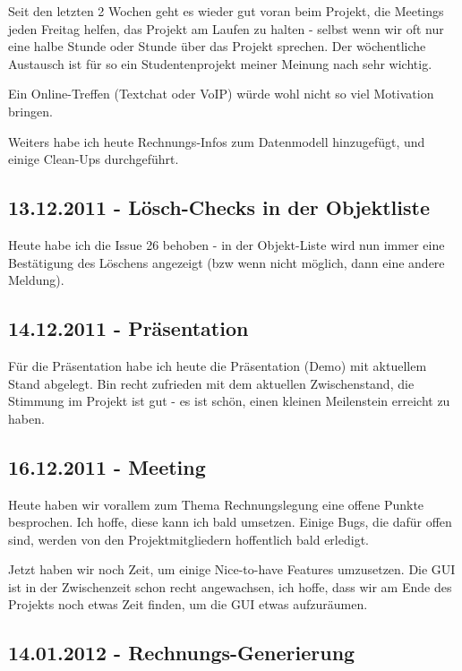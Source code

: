 \documentclass[11pt]{scrartcl}
\begin{document}
Seit den letzten 2 Wochen geht es wieder gut voran beim Projekt, die Meetings
jeden Freitag helfen, das Projekt am Laufen zu halten - selbst wenn wir oft nur
eine halbe Stunde oder Stunde über das Projekt sprechen. Der wöchentliche
Austausch ist für so ein Studentenprojekt meiner Meinung nach sehr wichtig.

Ein Online-Treffen (Textchat oder VoIP) würde wohl nicht so viel Motivation
bringen.

Weiters habe ich heute Rechnungs-Infos zum Datenmodell hinzugefügt, und einige
Clean-Ups durchgeführt.


\subsection{13.12.2011 - Lösch-Checks in der Objektliste}

Heute habe ich die Issue 26 behoben - in der Objekt-Liste wird nun immer eine
Bestätigung des Löschens angezeigt (bzw wenn nicht möglich, dann eine andere
Meldung).


\subsection{14.12.2011 - Präsentation}

Für die Präsentation habe ich heute die Präsentation (Demo) mit aktuellem
Stand abgelegt. Bin recht zufrieden mit dem aktuellen Zwischenstand, die
Stimmung im Projekt ist gut - es ist schön, einen kleinen Meilenstein erreicht
zu haben.

\subsection{16.12.2011 - Meeting}

Heute haben wir vorallem zum Thema Rechnungslegung eine offene Punkte
besprochen. Ich hoffe, diese kann ich bald umsetzen. Einige Bugs, die dafür
offen sind, werden von den Projektmitgliedern hoffentlich bald erledigt.

Jetzt haben wir noch Zeit, um einige Nice-to-have Features umzusetzen. Die GUI
ist in der Zwischenzeit schon recht angewachsen, ich hoffe, dass wir am Ende
des Projekts noch etwas Zeit finden, um die GUI etwas aufzuräumen.


\subsection{14.01.2012 - Rechnungs-Generierung}
\end{document}
